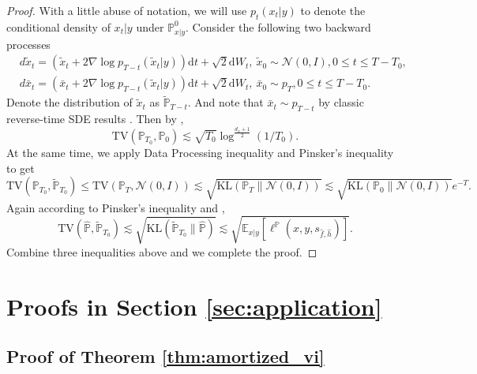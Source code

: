\documentclass{article}
\numberwithin{equation}{section}
\newcommand{\E}{\mathbb{E}}
\newcommand{\dif}{\mathrm{d}}
\theoremstyle{definition}
\renewcommand{\P}{\mathbb{P}}
\begin{document}
\begin{proof}
    With a little abuse of notation, we will use $p_t(x_t|y)$ to denote the conditional density of $x_t|y$ under $\P^0_{x|y}$.
    Consider the following two backward processes
    \begin{align}
        &d\widetilde{x}_t=(\widetilde{x}_t+2\nabla\log p_{T-t}(\widetilde{x}_t|y))\dif t+\sqrt{2}\dif W_t,\ \widetilde{x}_0\sim \mathcal{N}(0,I), 0\leq t\leq T-T_0,
        \\
        &d\bar{x}_t=(\bar{x}_t+2\nabla\log p_{T-t}(\widetilde{x}_t|y))\dif t+\sqrt{2}\dif W_t,\ \bar{x}_0\sim p_T, 0\leq t\leq T-T_0.
    \end{align}
    Denote the distribution of $\widetilde{x}_t$ as $\widetilde{\P}_{T-t}$.
    And note that $\bar{x}_t\sim p_{T-t}$ by classic reverse-time SDE results \citep{anderson1982reverse}. 
    Then by \citet[Lemma D.5]{fu2024unveil},
    \begin{equation}
        \mathrm{TV}(\P_{T_0},\P_0)\lesssim \sqrt{T_0}\log^{\frac{d_x+1}{2}}(1/T_0).
    \end{equation}
    At the same time, we apply Data Processing inequality and Pinsker's inequality to get
    \begin{equation}
        \mathrm{TV}(\P_{T_0},\widetilde{\P}_{T_0})\leq \mathrm{TV}(\P_{T},\mathcal{N}(0,I))\lesssim \sqrt{\mathrm{KL}(\P_{T}\|\mathcal{N}(0,I))}\lesssim \sqrt{\mathrm{KL}(\P_0\|\mathcal{N}(0,I))}e^{-T}.
    \end{equation}
    Again according to Pinsker's inequality and \citet[Proposition D.1]{oko2023diffusion},
    \begin{equation}
        \mathrm{TV}(\widehat{\P},\widetilde{\P}_{T_0})
        \lesssim \sqrt{\mathrm{KL}(\widetilde{\P}_{T_0}\|\widehat{\P})}\lesssim \sqrt{\E_{x|y}[\ell^\P(x,y,s_{\widehat{f},\widehat{h}})]}.
    \end{equation}
    Combine three inequalities above and we complete the proof.
\end{proof}

\section{Proofs in Section \ref{sec:application}}

\subsection{Proof of Theorem \ref{thm:amortized_vi}}\label{app:subsec:proof_avi}
\end{document}
